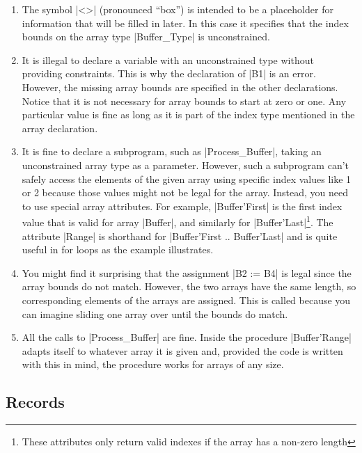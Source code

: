 \begin{enumerate}

\item The symbol |<>| (pronounced ``box'') is intended to be a placeholder for information that
  will be filled in later. In this case it specifies that the index bounds on the array type
  |Buffer_Type| is unconstrained.

\item It is illegal to declare a variable with an unconstrained type without providing
  constraints. This is why the declaration of |B1| is an error. However, the missing array
  bounds are specified in the other declarations. Notice that it is not necessary for array
  bounds to start at zero or one. Any particular value is fine as long as it is part of the
  index type mentioned in the array declaration.

\item It is fine to declare a subprogram, such as |Process_Buffer|, taking an unconstrained
  array type as a parameter. However, such a subprogram can't safely access the elements of the
  given array using specific index values like 1 or 2 because those values might not be legal
  for the array. Instead, you need to use special array attributes. For example, |Buffer'First|
  is the first index value that is valid for array |Buffer|, and similarly for
  |Buffer'Last|\footnote{These attributes only return valid indexes if the array has a non-zero
    length}. The attribute |Range| is shorthand for |Buffer'First .. Buffer'Last| and is quite
  useful in for loops as the example illustrates.

\item You might find it surprising that the assignment |B2 := B4| is legal since the array
  bounds do not match. However, the two arrays have the same length, so corresponding elements of
  the arrays are assigned. This is called  because you can imagine
  sliding one array over until the bounds do match.

\item All the calls to |Process_Buffer| are fine. Inside the procedure |Buffer'Range| adapts
  itself to whatever array it is given and, provided the code is written with this in mind, the
  procedure works for arrays of any size.

\end{enumerate}

\subsection{Records}

